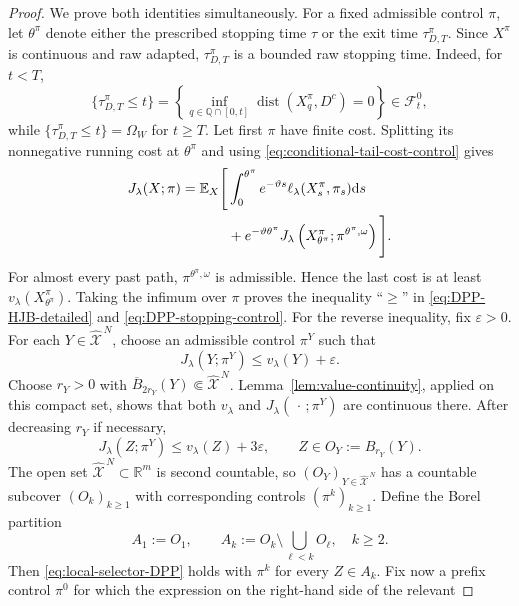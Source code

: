 \documentclass[11pt]{article}
\def\E{\mathbb{E}}
\def\R{\mathbb{R}}
\def\Fc{{\mathcal F}}
\def\Xc{{\mathcal X}}
\def\hX{\widehat{\Xc}^{\,N}}
\newcommand{\dd}{\mathrm{d}}
\theoremstyle{definition}
\theoremstyle{remark}
\numberwithin{equation}{section}
\begin{document}
\begin{proof}
We prove both identities simultaneously.  For a fixed admissible control $\pi$, let $\theta^\pi$
denote either the prescribed stopping time $\tau$ or the exit time $\tau_{D,T}^\pi$.  Since
$X^\pi$ is continuous and raw adapted, $\tau_{D,T}^\pi$ is a bounded raw stopping time.  Indeed,
for $t<T$,
\[
 \{\tau_{D,T}^\pi\le t\}
 =\left\{
 \inf_{q\in\mathbb Q\cap[0,t]}
 \operatorname{dist}(X_q^\pi,D^c)=0
 \right\}\in\Fc_t^0,
\]
while $\{\tau_{D,T}^\pi\le t\}=\Omega_W$ for $t\ge T$.
Let first $\pi$ have finite cost.  Splitting its nonnegative running cost at $\theta^\pi$ and using
\eqref{eq:conditional-tail-cost-control} gives
\begin{align}
 J_\lambda(X;\pi)
 =\E_X\Bigg[&\int_0^{\theta^\pi}e^{-\vartheta s}
 \ell_\lambda(X_s^\pi,\pi_s)\dd s\notag\\
 &+e^{-\vartheta\theta^\pi}
 J_\lambda\left(X_{\theta^\pi}^\pi;
 \pi^{\theta^\pi,\omega}\right)\Bigg].
 \label{eq:cost-split-DPP}
\end{align}
For almost every past path, $\pi^{\theta^\pi,\omega}$ is admissible.  Hence the last cost is at
least $v_\lambda(X_{\theta^\pi}^\pi)$.  Taking the infimum over $\pi$ proves the inequality
``$\ge$'' in \eqref{eq:DPP-HJB-detailed} and \eqref{eq:DPP-stopping-control}.
For the reverse inequality, fix $\varepsilon>0$.  For each $Y\in\hX$, choose an admissible control
$\pi^Y$ such that
\begin{equation}\label{eq:epsilon-optimal-continuations-DPP}
 J_\lambda(Y;\pi^Y)\le v_\lambda(Y)+\varepsilon.
\end{equation}
Choose $r_Y>0$ with $\overline B_{2r_Y}(Y)\Subset\hX$.  Lemma~\ref{lem:value-continuity}, applied
on this compact set, shows that both $v_\lambda$ and
$J_\lambda(\,\cdot\,;\pi^Y)$ are continuous there.  After decreasing $r_Y$ if necessary,
\begin{equation}\label{eq:local-selector-DPP}
 J_\lambda(Z;\pi^Y)\le v_\lambda(Z)+3\varepsilon,
 \qquad Z\in O_Y:=B_{r_Y}(Y).
\end{equation}
The open set $\hX\subset\R^m$ is second countable, so $(O_Y)_{Y\in\hX}$ has a countable subcover
$(O_k)_{k\ge1}$ with corresponding controls $(\pi^k)_{k\ge1}$.  Define the Borel partition
\begin{equation}\label{eq:Borel-partition-DPP}
 A_1:=O_1,
 \qquad
 A_k:=O_k\setminus\bigcup_{\ell<k}O_\ell,
 \quad k\ge2.
\end{equation}
Then \eqref{eq:local-selector-DPP} holds with $\pi^k$ for every $Z\in A_k$.
Fix now a prefix control $\pi^0$ for which the expression on the right-hand side of the relevant

\end{proof}
\end{document}

